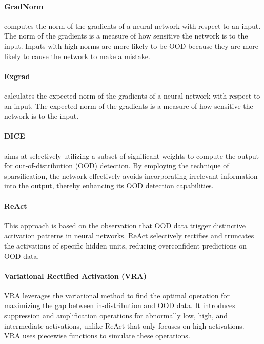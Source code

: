 \documentclass{article}
\begin{document}
\paragraph{GradNorm \cite{huang2021importance}} computes the norm of the gradients of a neural network with respect to an input. The norm of the gradients is a measure of how sensitive the network is to the input. Inputs with high norms are more likely to be OOD because they are more likely to cause the network to make a mistake.

\paragraph{Exgrad\cite{igoe2022useful}} calculates the expected norm of the gradients of a neural network with respect to an input. The expected norm of the gradients is a measure of how sensitive the network is to the input. 

\paragraph{DICE \cite{sun2022dice}} aims at selectively utilizing a subset of significant weights to compute the output for out-of-distribution (OOD) detection. By employing the technique of sparsification, the network effectively avoids incorporating irrelevant information into the output, thereby enhancing its OOD detection capabilities.

\paragraph{ReAct \cite{sun2021react}} This approach is based on the observation that OOD data trigger distinctive activation patterns in neural networks. ReAct selectively rectifies and truncates the activations of specific hidden units, reducing overconfident predictions on OOD data. 

\paragraph{Variational Rectified Activation (VRA) \cite{xu2023vra}} VRA leverages the variational method to find the optimal operation for maximizing the gap between in-distribution and OOD data. It introduces suppression and amplification operations for abnormally low, high, and intermediate activations, unlike ReAct that only focuses on high activations. VRA uses piecewise functions to simulate these operations. 
\end{document}

